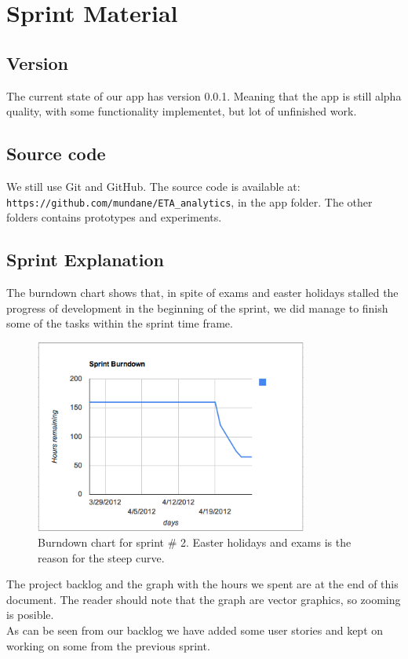 \section{Sprint Material} %
\label{sec:Sprint Material}
\subsection{Version} %
\label{sub:Version}
The current state of our app has version 0.0.1. Meaning that the app is still alpha quality, with some functionality implementet, but lot of unfinished work.
\subsection{Source code} %
\label{sub:Source code}
We still use Git and GitHub. The source code is available at: \verb!https://github.com/mundane/ETA_analytics!, in the app folder. The other folders contains prototypes and experiments.
\subsection{Sprint Explanation}
The burndown chart shows that, in spite of exams and easter holidays stalled the progress of development in the beginning of the sprint, we did manage to finish some of the tasks within the sprint time frame.
\begin{figure}[h!]
  \centering
    \includegraphics[width=0.8\textwidth]{images/burndown.png}
	\caption{Burndown chart for sprint \# 2. Easter holidays and exams is the reason for the steep curve.}
\end{figure}
The project backlog and the graph with the hours we spent are at the end of this document. The reader should note that the graph are vector graphics, so zooming is posible. \\
As can be seen from our backlog we have added some user stories and kept on working on some from the previous sprint.
